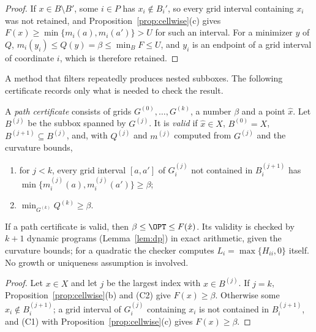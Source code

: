 \begin{proof}
If $x\in B\setminus B'$, some $i\in P$ has $x_i\notin B_i'$, so every grid
interval containing $x_i$ was not retained, and
Proposition~\ref{prop:cellwise}(c) gives $F(x)\ge\min\{m_i(a),m_i(a')\}>U$
for such an interval. For a minimizer $y$ of $Q$,
$m_i(y_i)\le Q(y)=\beta\le\min_BF\le U$, and $y_i$ is an endpoint of a grid
interval of coordinate $i$, which is therefore retained.
\end{proof}

A method that filters repeatedly produces nested subboxes. The following
certificate records only what is needed to check the result.

\begin{definition}\label{def:cert}
A \emph{path certificate} consists of grids $G^{(0)},\dots,G^{(k)}$, a number
$\beta$ and a point $\hat x$. Let $B^{(j)}$ be the subbox spanned by
$G^{(j)}$. It is \emph{valid} if $\hat x\in X$, $B^{(0)}=X$,
$B^{(j+1)}\subseteq B^{(j)}$, and, with $Q^{(j)}$ and $m^{(j)}$ computed from
$G^{(j)}$ and the curvature bounds,
\begin{enumerate}[label=(C\arabic*)]
\item for $j<k$, every grid interval $[a,a']$ of $G^{(j)}_i$ not contained in
$B^{(j+1)}_i$ has $\min\{m^{(j)}_i(a),m^{(j)}_i(a')\}\ge\beta$;
\item $\min_{G^{(k)}}Q^{(k)}\ge\beta$.
\end{enumerate}
\end{definition}

\begin{theorem}\label{thm:certificate}
If a path certificate is valid, then $\beta\le\OPT\le F(\hat x)$. Its
validity is checked by $k+1$ dynamic programs (Lemma~\ref{lem:dp}) in exact
arithmetic, given the curvature bounds; for a quadratic the checker computes
$L_i=\max\{H_{ii},0\}$ itself. No growth or uniqueness assumption is involved.
\end{theorem}

\begin{proof}
Let $x\in X$ and let $j$ be the largest index with $x\in B^{(j)}$. If $j=k$,
Proposition~\ref{prop:cellwise}(b) and (C2) give $F(x)\ge\beta$. Otherwise some
$x_i\notin B^{(j+1)}_i$; a grid interval of $G_i^{(j)}$ containing $x_i$ is not
contained in $B_i^{(j+1)}$, and (C1) with Proposition~\ref{prop:cellwise}(c)
gives $F(x)\ge\beta$.
\end{proof}

